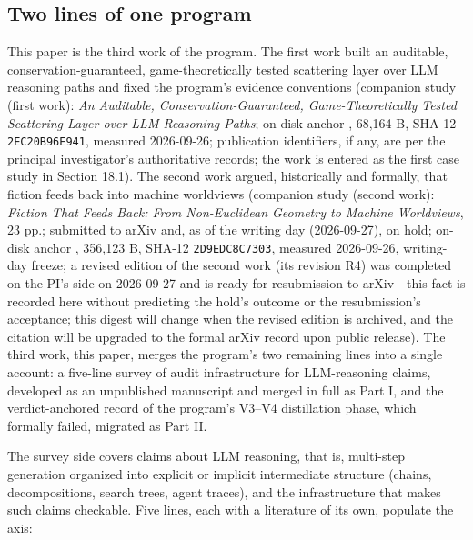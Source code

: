 \documentclass[11pt]{article}
\newcommand{\sha}[1]{\texttt{#1}}
\begin{document}
\subsection{Two lines of one program}
\noindent This paper is the third work of the program. The first work built an auditable, conservation-guaranteed, game-theoretically tested scattering layer over LLM reasoning paths and fixed the program's evidence conventions (companion study (first work): \emph{An Auditable, Conservation-Guaranteed, Game-Theoretically Tested Scattering Layer over LLM Reasoning Paths}; on-disk anchor , 68,164 B, SHA-12 \sha{2EC20B96E941}, measured 2026-09-26; publication identifiers, if any, are per the principal investigator's authoritative records; the work is entered as the first case study in Section 18.1). The second work argued, historically and formally, that fiction feeds back into machine worldviews (companion study (second work): \emph{Fiction That Feeds Back: From Non-Euclidean Geometry to Machine Worldviews}, 23 pp.; submitted to arXiv and, as of the writing day (2026-09-27), on hold; on-disk anchor , 356,123 B, SHA-12 \sha{2D9EDC8C7303}, measured 2026-09-26, writing-day freeze; a revised edition of the second work (its revision R4) was completed on the PI's side on 2026-09-27 and is ready for resubmission to arXiv—this fact is recorded here without predicting the hold's outcome or the resubmission's acceptance; this digest will change when the revised edition is archived, and the citation will be upgraded to the formal arXiv record upon public release). The third work, this paper, merges the program's two remaining lines into a single account: a five-line survey of audit infrastructure for LLM-reasoning claims, developed as an unpublished manuscript and merged in full as Part I, and the verdict-anchored record of the program's V3–V4 distillation phase, which formally failed, migrated as Part II.\par
\noindent The survey side covers claims about LLM reasoning, that is, multi-step generation organized into explicit or implicit intermediate structure (chains, decompositions, search trees, agent traces), and the infrastructure that makes such claims checkable. Five lines, each with a literature of its own, populate the axis:\par
\begingroup\small
\end{document}
